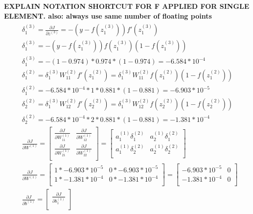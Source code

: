 \documentclass[leqno]{article}
\begin{document}
\textbf{EXPLAIN NOTATION SHORTCUT FOR F APPLIED FOR SINGLE ELEMENT. also: always use same number of floating points}
\begin{gather*}
\begin{split}
&\delta_1^{(3)} = \frac{\partial J}{\partial z^{(3)}} = -(y - f(z_1^{(3)}))f'(z_1^{(3)}) \\ 
&\delta_1^{(3)} =  -(y - f(z_1^{(3)}))f(z_1^{(3)})(1 - f(z_1^{(3)}))\\
&\delta_1^{(3)} = -(1 - 0.974)*0.974*(1 - 0.974) = -6.584*10^{-4}\\
&\delta_1^{(2)} = \delta_1^{(3)}W_{11}^{(2)}f'(z_1^{(2)}) = \delta_1^{(3)}W_{11}^{(2)}f(z_1^{(2)})(1 - f(z_1^{(2)}))\\
&\delta_1^{(2)} = -6.584*10^{-4}*1*0.881*(1 - 0.881) = -6.903*10^{-5}\\
&\delta_2^{(2)} = \delta_1^{(3)}W_{12}^{(2)}f'(z_2^{(2)}) = \delta_1^{(3)}W_{12}^{(2)}f(z_2^{(2)})(1 - f(z_2^{(2)}))\\
&\delta_2^{(2)} = -6.584*10^{-4}*2*0.881*(1 - 0.881) = -1.381*10^{-4}\\ 
&\frac{\partial J}{\partial W^{(1)}} = 
 \begin{bmatrix}
   \frac{\partial J}{\partial W_{11}^{(1)}} & \frac{\partial J}{\partial W_{12}^{(1)}}\\ 
  \frac{\partial J}{\partial W_{21}^{(1)}} & \frac{\partial J}{\partial W_{22}^{(1)}}\\
  \end{bmatrix}
   =
 \begin{bmatrix}
   a_1^{(1)}\delta_1^{(2)} & a_2^{(1)}\delta_1^{(2)}\\ 
   a_1^{(1)}\delta_2^{(2)} & a_2^{(1)}\delta_2^{(2)}\\
  \end{bmatrix}\\
& \frac{\partial J}{\partial W^{(1)}} =
  \begin{bmatrix}
   1*-6.903*10^{-5} & 0*-6.903*10^{-5}\\ 
   1*-1.381*10^{-4} & 0*-1.381*10^{-4}\\
  \end{bmatrix}
 =
  \begin{bmatrix}
   -6.903*10^{-5} & 0\\ 
   -1.381*10^{-4} & 0\\
  \end{bmatrix}
\\
&\frac{\partial J}{\partial b^{(1)}} = 
 \begin{bmatrix}
   \frac{\partial J}{\partial b_1^{(1)}}\\ 

\end{bmatrix}
\end{split}
\end{gather*}
\end{document}
